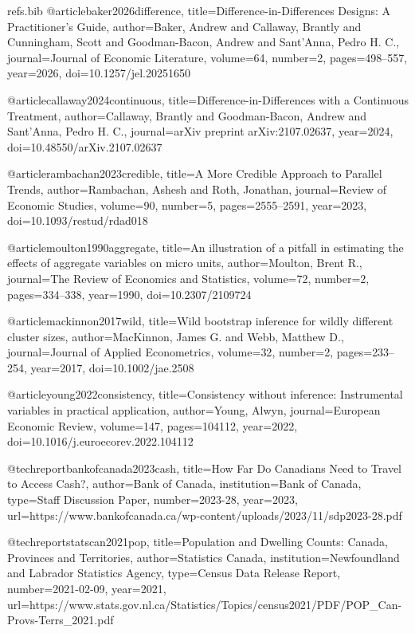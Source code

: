 \begin{filecontents}[overwrite]{refs.bib}
@article{baker2026difference,
  title={Difference-in-Differences Designs: A Practitioner's Guide},
  author={Baker, Andrew and Callaway, Brantly and Cunningham, Scott and Goodman-Bacon, Andrew and Sant'Anna, Pedro H. C.},
  journal={Journal of Economic Literature},
  volume={64},
  number={2},
  pages={498--557},
  year={2026},
  doi={10.1257/jel.20251650}
}

@article{callaway2024continuous,
  title={Difference-in-Differences with a Continuous Treatment},
  author={Callaway, Brantly and Goodman-Bacon, Andrew and Sant'Anna, Pedro H. C.},
  journal={arXiv preprint arXiv:2107.02637},
  year={2024},
  doi={10.48550/arXiv.2107.02637}
}

@article{rambachan2023credible,
  title={A More Credible Approach to Parallel Trends},
  author={Rambachan, Ashesh and Roth, Jonathan},
  journal={Review of Economic Studies},
  volume={90},
  number={5},
  pages={2555--2591},
  year={2023},
  doi={10.1093/restud/rdad018}
}

@article{moulton1990aggregate,
  title={An illustration of a pitfall in estimating the effects of aggregate variables on micro units},
  author={Moulton, Brent R.},
  journal={The Review of Economics and Statistics},
  volume={72},
  number={2},
  pages={334--338},
  year={1990},
  doi={10.2307/2109724}
}

@article{mackinnon2017wild,
  title={Wild bootstrap inference for wildly different cluster sizes},
  author={MacKinnon, James G. and Webb, Matthew D.},
  journal={Journal of Applied Econometrics},
  volume={32},
  number={2},
  pages={233--254},
  year={2017},
  doi={10.1002/jae.2508}
}

@article{young2022consistency,
  title={Consistency without inference: Instrumental variables in practical application},
  author={Young, Alwyn},
  journal={European Economic Review},
  volume={147},
  pages={104112},
  year={2022},
  doi={10.1016/j.euroecorev.2022.104112}
}

@techreport{bankofcanada2023cash,
  title={How Far Do Canadians Need to Travel to Access Cash?},
  author={{Bank of Canada}},
  institution={Bank of Canada},
  type={Staff Discussion Paper},
  number={2023-28},
  year={2023},
  url={https://www.bankofcanada.ca/wp-content/uploads/2023/11/sdp2023-28.pdf}
}

@techreport{statscan2021pop,
  title={Population and Dwelling Counts: Canada, Provinces and Territories},
  author={{Statistics Canada}},
  institution={Newfoundland and Labrador Statistics Agency},
  type={Census Data Release Report},
  number={2021-02-09},
  year={2021},
  url={https://www.stats.gov.nl.ca/Statistics/Topics/census2021/PDF/POP_Can-Provs-Terrs_2021.pdf}
}


\end{filecontents}
